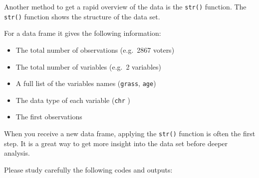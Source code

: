 \documentclass[
]{book}
\newenvironment{Shaded}{\begin{snugshade}}{\end{snugshade}}
\newcommand{\CommentTok}[1]{\textcolor[rgb]{0.56,0.35,0.01}{\textit{#1}}}
\newcommand{\FloatTok}[1]{\textcolor[rgb]{0.00,0.00,0.81}{#1}}
\newcommand{\FunctionTok}[1]{\textcolor[rgb]{0.00,0.00,0.00}{#1}}
\newcommand{\NormalTok}[1]{#1}
\providecommand{\tightlist}{%
  \setlength{\itemsep}{0pt}\setlength{\parskip}{0pt}}
\begin{document}
Another method to get a rapid overview of the data is the \texttt{str()} function. The \texttt{str()} function shows the structure of the data set.

\begin{Shaded}
\end{Shaded}

For a data frame it gives the following information:

\begin{itemize}
\tightlist
\item
  The total number of observations (e.g.~2867 voters)
\item
  The total number of variables (e.g.~2 variables)
\item
  A full list of the variables names (\texttt{grass}, \texttt{age})
\item
  The data type of each variable (\texttt{chr} )
\item
  The first observations
\end{itemize}

When you receive a new data frame, applying the \texttt{str()} function is often the first step. It is a great way to get more insight into the data set before deeper analysis.

Please study carefully the following codes and outputs:
\end{document}
